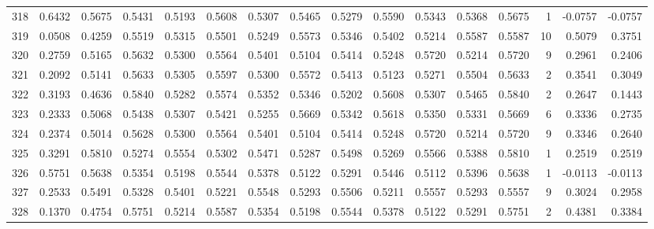 \begin{tabular}{lrrrrrrrrrrrrrrr}
318 &      0.6432 &  0.5675 &  0.5431 &  0.5193 &  0.5608 &  0.5307 &  0.5465 &  0.5279 &  0.5590 &  0.5343 &   0.5368 &     0.5675 &      1 &                   -0.0757 &                    -0.0757 \\
319 &      0.0508 &  0.4259 &  0.5519 &  0.5315 &  0.5501 &  0.5249 &  0.5573 &  0.5346 &  0.5402 &  0.5214 &   0.5587 &     0.5587 &     10 &                    0.5079 &                     0.3751 \\
320 &      0.2759 &  0.5165 &  0.5632 &  0.5300 &  0.5564 &  0.5401 &  0.5104 &  0.5414 &  0.5248 &  0.5720 &   0.5214 &     0.5720 &      9 &                    0.2961 &                     0.2406 \\
321 &      0.2092 &  0.5141 &  0.5633 &  0.5305 &  0.5597 &  0.5300 &  0.5572 &  0.5413 &  0.5123 &  0.5271 &   0.5504 &     0.5633 &      2 &                    0.3541 &                     0.3049 \\
322 &      0.3193 &  0.4636 &  0.5840 &  0.5282 &  0.5574 &  0.5352 &  0.5346 &  0.5202 &  0.5608 &  0.5307 &   0.5465 &     0.5840 &      2 &                    0.2647 &                     0.1443 \\
323 &      0.2333 &  0.5068 &  0.5438 &  0.5307 &  0.5421 &  0.5255 &  0.5669 &  0.5342 &  0.5618 &  0.5350 &   0.5331 &     0.5669 &      6 &                    0.3336 &                     0.2735 \\
324 &      0.2374 &  0.5014 &  0.5628 &  0.5300 &  0.5564 &  0.5401 &  0.5104 &  0.5414 &  0.5248 &  0.5720 &   0.5214 &     0.5720 &      9 &                    0.3346 &                     0.2640 \\
325 &      0.3291 &  0.5810 &  0.5274 &  0.5554 &  0.5302 &  0.5471 &  0.5287 &  0.5498 &  0.5269 &  0.5566 &   0.5388 &     0.5810 &      1 &                    0.2519 &                     0.2519 \\
326 &      0.5751 &  0.5638 &  0.5354 &  0.5198 &  0.5544 &  0.5378 &  0.5122 &  0.5291 &  0.5446 &  0.5112 &   0.5396 &     0.5638 &      1 &                   -0.0113 &                    -0.0113 \\
327 &      0.2533 &  0.5491 &  0.5328 &  0.5401 &  0.5221 &  0.5548 &  0.5293 &  0.5506 &  0.5211 &  0.5557 &   0.5293 &     0.5557 &      9 &                    0.3024 &                     0.2958 \\
328 &      0.1370 &  0.4754 &  0.5751 &  0.5214 &  0.5587 &  0.5354 &  0.5198 &  0.5544 &  0.5378 &  0.5122 &   0.5291 &     0.5751 &      2 &                    0.4381 &                     0.3384 \\

\end{tabular}
